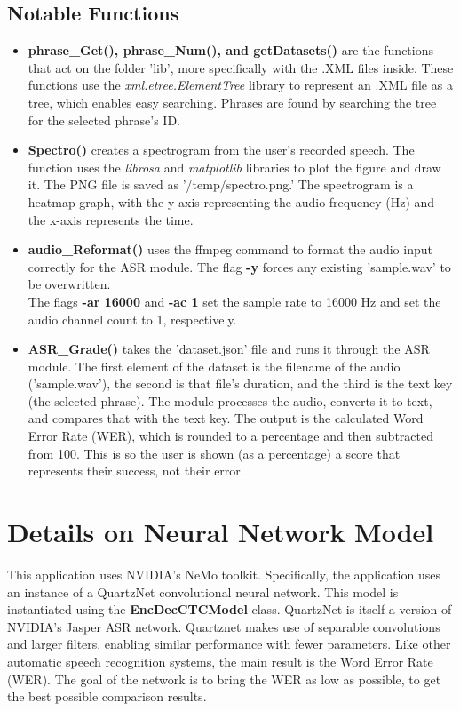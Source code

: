 \documentclass[12pt, letterpaper]{article}
\begin{document}
\subsection*{Notable Functions}
\begin{itemize}
\item{\textbf{phrase\_Get(), phrase\_Num(), and getDatasets()} are the functions that act on the folder 'lib', more specifically with the .XML files inside. These functions use the \textit{xml.etree.ElementTree} library to represent an .XML file as a tree, which enables easy searching. Phrases are found by searching the tree for the selected phrase's ID.}

\item{\textbf{Spectro()} creates a spectrogram from the user's recorded speech. The function uses the \textit{librosa} and \textit{matplotlib} libraries to plot the figure and draw it. The PNG file is saved as '/temp/spectro.png.' The spectrogram is a heatmap graph, with the y-axis representing the audio frequency (Hz) and the x-axis represents the time.}

\item{\textbf{audio\_Reformat()} uses the ffmpeg command to format the audio input correctly for the ASR module. The flag \textbf{-y} forces any existing 'sample.wav' to be overwritten. \\The flags \textbf{-ar 16000} and \textbf{-ac 1} set the sample rate to 16000 Hz and set the audio channel count to 1, respectively.}

\item{\textbf{ASR\_Grade()} takes the 'dataset.json' file and runs it through the ASR module. The first element of the dataset is the filename of the audio ('sample.wav'), the second is that file's duration, and the third is the text key (the selected phrase). The module processes the audio, converts it to text, and compares that with the text key. The output is the calculated Word Error Rate (WER), which is rounded to a percentage and then subtracted from 100. This is so the user is shown (as a percentage) a score that represents their success, not their error.}
\end{itemize}
\newpage%


\section*{Details on Neural Network Model}
This application uses NVIDIA's NeMo toolkit. Specifically, the application uses an instance of a QuartzNet convolutional neural network. This model is instantiated using the \textbf{EncDecCTCModel} class. QuartzNet is itself a version of NVIDIA's Jasper ASR network. Quartznet makes use of separable convolutions and larger filters, enabling similar performance with fewer parameters. Like other automatic speech recognition systems, the main result is the Word Error Rate (WER). The goal of the network is to bring the WER as low as possible, to get the best possible comparison results. 
\end{document}
